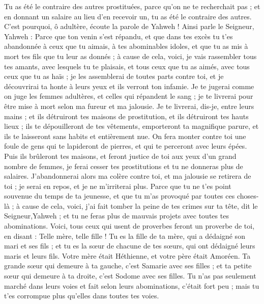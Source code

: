 \begin{multicols}{2}
Tu as été le contraire des autres prostituées, parce qu’on ne te recherchait pas ; et en donnant un salaire au lieu d’en recevoir un, tu as été le contraire des autres.
C'est pourquoi, ô adultère, écoute la parole de Yahweh !
Ainsi parle le Seigneur, Yahweh : Parce que ton venin s'est répandu, et que dans tes excès tu t'es abandonnée à ceux que tu aimais, à tes abominables idoles, et que tu as mis à mort tes fils que tu leur as donnés ;
à cause de cela, voici, je vais rassembler tous tes amants, avec lesquels tu te plaisais, et tous ceux que tu as aimés, avec tous ceux que tu as haïs ; je les assemblerai de toutes parts contre toi, et je découvrirai ta honte à leurs yeux et ils verront ton infamie.
Je te jugerai comme on juge les femmes adultères, et celles qui répandent le sang ; je te livrerai pour être mise à mort selon ma fureur et ma jalousie.
Je te livrerai, dis-je, entre leurs mains ; et ils détruiront tes maisons de prostitution, et ils détruiront tes hauts lieux ; ils te dépouilleront de tes vêtements, emporteront ta magnifique parure, et ils te laisseront sans habits et entièrement nue.
On fera monter contre toi une foule de gens qui te lapideront de pierres, et qui te perceront avec leurs épées.
Puis ils brûleront tes maisons, et feront justice de toi aux yeux d’un grand nombre de femmes, je ferai cesser tes prostitutions et tu ne donneras plus de salaires.
J’abandonnerai alors ma colère contre toi, et ma jalousie se retirera de toi ; je serai en repos, et je ne m’irriterai plus.
Parce que tu ne t'es point souvenue du temps de ta jeunesse, et que tu m'as provoqué par toutes ces choses-là ; à cause de cela, voici, j'ai fait tomber la peine de tes crimes sur ta tête, dit le Seigneur,Yahweh ; et tu ne feras plus de mauvais projets avec toutes tes abominations.
Voici, tous ceux qui usent de proverbes feront un proverbe de toi, en disant : Telle mère, telle fille !
Tu es la fille de ta mère, qui a dédaigné son mari et ses fils ; et tu es la sœur de chacune de tes sœurs, qui ont dédaigné leurs maris et leurs fils. Votre mère était Héthienne, et votre père était Amoréen.
Ta grande sœur qui demeure à ta gauche, c'est Samarie avec ses filles ; et ta petite sœur qui demeure à ta droite, c'est Sodome avec ses filles.
Tu n'as pas seulement marché dans leurs voies et fait selon leurs abominations, c’était fort peu ; mais tu t'es corrompue plus qu'elles dans toutes tes voies.

\end{multicols}
